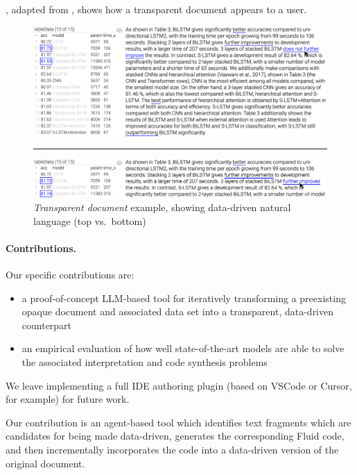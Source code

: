 , adapted from \cite{zhang18}, shows how a transparent document appears to a
user.

\begin{figure}%
    \centering
    \includegraphics[width=\linewidth]{fig/scigen-1805.02474v1-10-with-pointer.png}
    \vspace{1mm}
    \hrule
    \includegraphics[width=\linewidth]{fig/scigen-1805.02474v1-10-counterfactual-with-pointer.png}
    \caption{\emph{Transparent document} example, showing data-driven natural language (top
    vs.~bottom)}
    \label{fig:scigen-example-website}
\end{figure}


\paragraph{Contributions.} Our specific contributions are:

\begin{itemize}
\item a proof-of-concept LLM-based tool for iteratively transforming a preexisting opaque document and
associated data set into a transparent, data-driven counterpart
\item an empirical evaluation of how well state-of-the-art models are able to solve the associated
interpretation and code synthesis problems
\end{itemize}

We leave implementing a full IDE authoring plugin (based on VSCode or Cursor, for example) for future work.

Our contribution is an agent-based tool which identifies text fragments which are candidates for being made
data-driven, generates the corresponding Fluid code, and then incrementally incorporates the code into a
data-driven version of the original document.

